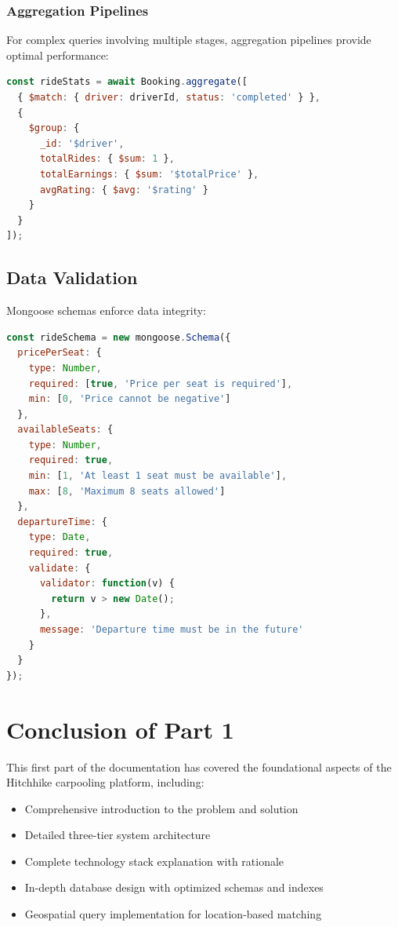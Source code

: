 \documentclass[12pt,a4paper]{article}
\begin{document}
\subsubsection{Aggregation Pipelines}
For complex queries involving multiple stages, aggregation pipelines provide optimal performance:

\begin{lstlisting}[language=JavaScript, caption=Aggregation Example]
const rideStats = await Booking.aggregate([
  { $match: { driver: driverId, status: 'completed' } },
  {
    $group: {
      _id: '$driver',
      totalRides: { $sum: 1 },
      totalEarnings: { $sum: '$totalPrice' },
      avgRating: { $avg: '$rating' }
    }
  }
]);
\end{lstlisting}

\subsection{Data Validation}

Mongoose schemas enforce data integrity:

\begin{lstlisting}[language=JavaScript, caption=Schema Validation Example]
const rideSchema = new mongoose.Schema({
  pricePerSeat: {
    type: Number,
    required: [true, 'Price per seat is required'],
    min: [0, 'Price cannot be negative']
  },
  availableSeats: {
    type: Number,
    required: true,
    min: [1, 'At least 1 seat must be available'],
    max: [8, 'Maximum 8 seats allowed']
  },
  departureTime: {
    type: Date,
    required: true,
    validate: {
      validator: function(v) {
        return v > new Date();
      },
      message: 'Departure time must be in the future'
    }
  }
});
\end{lstlisting}

\newpage

\section*{Conclusion of Part 1}

This first part of the documentation has covered the foundational aspects of the Hitchhike carpooling platform, including:

\begin{itemize}
    \item Comprehensive introduction to the problem and solution
    \item Detailed three-tier system architecture
    \item Complete technology stack explanation with rationale
    \item In-depth database design with optimized schemas and indexes
    \item Geospatial query implementation for location-based matching
\end{itemize}
\end{document}
